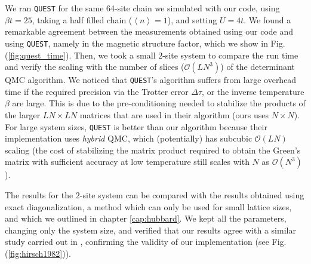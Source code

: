 We ran \texttt{QUEST} for the same 64-site chain we simulated with our code, using $\beta t = 25$, taking a half filled chain ($\left\langle n \right\rangle = 1$), and setting $U = 4t$.
We found a remarkable agreement between the measurements obtained using our code and using \texttt{QUEST}, namely in the magnetic structure factor, which we show in Fig.(\ref{fig:quest_time}).
Then, we took a small $2$-site system to compare the run time and verify the scaling with the number of slices ($\mathcal{O}(LN^3)$) of the determinant \ac{QMC} algorithm.
We noticed that \texttt{QUEST}'s algorithm suffers from large overhead time if the required precision via the Trotter error $\Delta \tau$, or the inverse temperature $\beta$ are large. 
This is due to the pre-conditioning needed to stabilize the products of the larger $L N \times L N$ matrices that are used in their algorithm (ours uses $N \times N$).
For large system sizes, \texttt{QUEST} is better than our algorithm because their implementation uses \emph{hybrid} \ac{QMC}, which (potentially) has subcubic $\mathcal{O}(LN)$ scaling (the cost of stabilizing the matrix product required to obtain the Green's matrix with sufficient accuracy at low temperature still scales with $N$ as $\mathcal{O}(N^3)$).

The results for the $2$-site system can be compared with the results obtained using exact diagonalization, a method which can only be used for small lattice sizes, and which we outlined in chapter \ref{cap:hubbard}.
We kept all the parameters, changing only the system size, and verified that our results agree with a similar study carried out in \cite{hirsch_discrete_1983}, confirming the validity of our implementation (see Fig.(\ref{fig:hirsch1982})).

